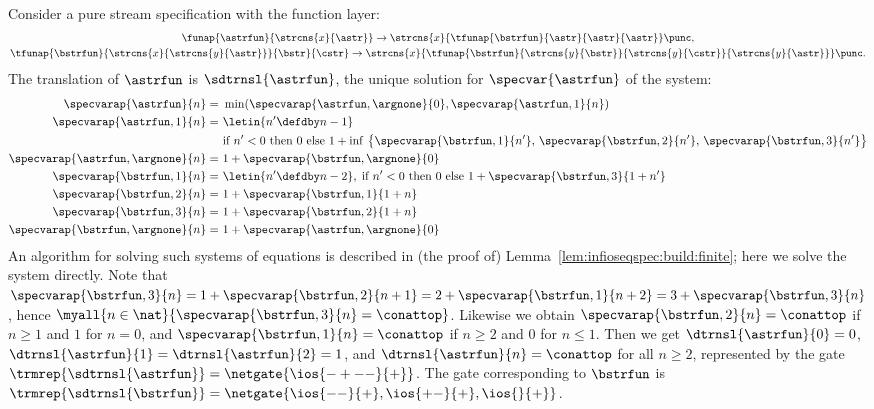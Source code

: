 \begin{example}\label{ex:pure}
  Consider a pure stream specification with the function layer: \begin{gather*}
    \funap{\astrfun}{\strcns{x}{\astr}} \to \strcns{x}{\tfunap{\bstrfun}{\astr}{\astr}{\astr}} \punc,
    \\
    \tfunap{\bstrfun}{\strcns{x}{\strcns{y}{\astr}}}{\bstr}{\cstr}
    \to \strcns{x}{\tfunap{\bstrfun}{\strcns{y}{\bstr}}{\strcns{y}{\cstr}}{\strcns{y}{\astr}}} \punc.
  \end{gather*}
The translation of $\astrfun$ is $\sdtrnsl{\astrfun}$,
  the unique solution for $\specvar{\astrfun}$ of the system:
\begin{align*}
    \specvarap{\astrfun}{n}
    =\ &\min(\specvarap{\astrfun,\argnone}{0}, \specvarap{\astrfun,1}{n})\\
    \specvarap{\astrfun,1}{n}
    =\ &\letin{n' \defdby n-1}\\
      &\text{if $n' < 0$ then $0$ else }
      1 +
      \inf\, \big\{ \specvarap{\bstrfun,1}{n'},\, \specvarap{\bstrfun,2}{n'},\,
                 \specvarap{\bstrfun,3}{n'} \big\}
    \\
    \specvarap{\astrfun,\argnone}{n}
    =\ &1 + \specvarap{\bstrfun,\argnone}{0}
    \\
    \specvarap{\bstrfun,1}{n}
    =\ &\letin{n' \defdby n-2},\;
      \text{if $n' < 0$ then $0$ else $1 + \specvarap{\bstrfun,3}{1 + n'}$}
    \\
    \specvarap{\bstrfun,2}{n}
    =\ &1 + \specvarap{\bstrfun,1}{1 + n}
    \\
    \specvarap{\bstrfun,3}{n}
    =\ &1 + \specvarap{\bstrfun,2}{1 + n}
    \\
    \specvarap{\bstrfun,\argnone}{n}
    =\ &1 + \specvarap{\astrfun,\argnone}{0}
  \end{align*}
An algorithm for solving such systems of equations is described
  in (the proof of) Lemma~\ref{lem:infioseqspec:build:finite}; here we solve the system directly.
  Note that
  $\specvarap{\bstrfun,3}{n} = 1 + \specvarap{\bstrfun,2}{n+1} = 2 + \specvarap{\bstrfun,1}{n+2} = 3 + \specvarap{\bstrfun,3}{n}$,
  hence $\myall{n \in \nat}{\specvarap{\bstrfun,3}{n} = \conattop}$.
  Likewise we obtain $\specvarap{\bstrfun,2}{n} = \conattop$ if $n \ge 1$ and $1$ for $n = 0$,
  and $\specvarap{\bstrfun,1}{n} = \conattop$ if $n \ge 2$ and $0$ for $n \le 1$.
  Then we get $\dtrnsl{\astrfun}{0}=0$, $\dtrnsl{\astrfun}{1}=\dtrnsl{\astrfun}{2}=1$,
  and $\dtrnsl{\astrfun}{n}=\conattop$ for all $n\geq 2$,
  represented by the gate $\trmrep{\sdtrnsl{\astrfun}}=\netgate{\ios{-+--}{+}}$.
  The gate corresponding to $\bstrfun$ is
  $\trmrep{\sdtrnsl{\bstrfun}}=\netgate{\ios{--}{+},\ios{+-}{+},\ios{}{+}}$.
  \end{example}
